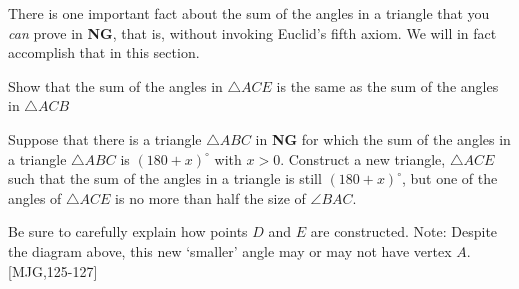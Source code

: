 \documentclass{ximera}
\begin{document}
There is one important fact about the sum of the angles in a triangle that you
\textit{can} prove in \textbf{NG}, that is, without invoking Euclid's fifth
axiom. We will in fact accomplish that in this section.

\begin{question}\label{20}
Show that the sum of the angles in $\triangle ACE$ is the same as the
sum of the angles in $\triangle ACB$
\begin{image}
\end{image}
\end{question}

\begin{question}\label{22} 
Suppose that there is a triangle $\triangle ABC$ in
\textbf{NG} for which the sum of the angles in a triangle $\triangle ABC$ is
$\left( 180+x\right)^\circ$ with $x>0$. Construct a new triangle,
$\triangle ACE$ such that the sum of the angles in a triangle is still
$\left( 180+x\right)^\circ$, but one of the angles of $\triangle ACE$
is no more than half the size of $\angle BAC$.
\begin{image}
\end{image}
Be sure to carefully explain how points $D$ and $E$ are constructed.
Note: Despite the diagram above, this new `smaller' angle may or may
not have vertex $A$. [MJG,125-127]
\end{question}
\end{document}
